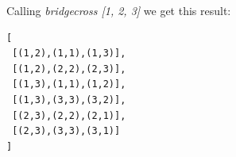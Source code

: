 Calling \emph{bridgecross [1, 2, 3]} we get this result:

\begin{lstlisting}
[
 [(1,2),(1,1),(1,3)],
 [(1,2),(2,2),(2,3)],
 [(1,3),(1,1),(1,2)],
 [(1,3),(3,3),(3,2)],
 [(2,3),(2,2),(2,1)],
 [(2,3),(3,3),(3,1)]
]
\end{lstlisting}


\newpage







